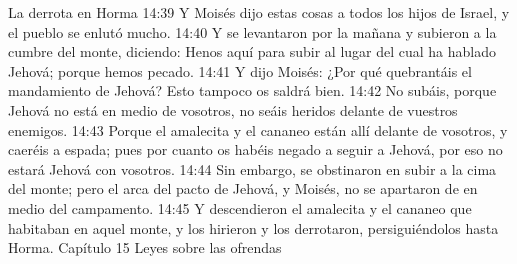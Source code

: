 La derrota en Horma   
14:39 Y Moisés dijo estas cosas a todos los hijos de Israel, y el pueblo se enlutó mucho.  
14:40 Y se levantaron por la mañana y subieron a la cumbre del monte, diciendo: Henos aquí para subir al lugar del cual ha hablado Jehová; porque hemos pecado.  
14:41 Y dijo Moisés: ¿Por qué quebrantáis el mandamiento de Jehová? Esto tampoco os saldrá bien.  
14:42 No subáis, porque Jehová no está en medio de vosotros, no seáis heridos delante de vuestros enemigos.  
14:43 Porque el amalecita y el cananeo están allí delante de vosotros, y caeréis a espada; pues por cuanto os habéis negado a seguir a Jehová, por eso no estará Jehová con vosotros.  
14:44 Sin embargo, se obstinaron en subir a la cima del monte; pero el arca del pacto de Jehová, y Moisés, no se apartaron de en medio del campamento.  
14:45 Y descendieron el amalecita y el cananeo que habitaban en aquel monte, y los hirieron y los derrotaron, persiguiéndolos hasta Horma.  
Capítulo 15 
Leyes sobre las ofrendas  

